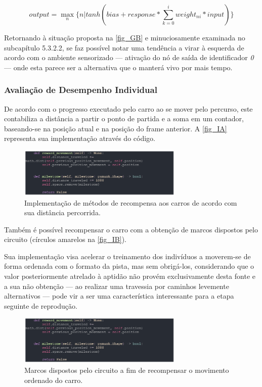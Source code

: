 \[ output = \max_{n}\{n | tanh(bias + response * \sum_{k=0}^{i} weight_{ni}*input)\} \]

Retornando à situação proposta na \autoref{fig_GB} e minuciosamente examinada no subcapítulo 5.3.2.2,
se faz possível notar uma tendência a virar à esquerda de acordo com o ambiente sensorizado —
ativação do nó de saída de identificador \textit{0} — onde esta parece ser a alternativa que o manterá vivo por mais tempo.

\subsubsection{Avaliação de Desempenho Individual}
De acordo com o progresso executado pelo carro ao se mover pelo percurso, este contabiliza a
distância a partir o ponto de partida e a soma em um contador, baseando-se na posição atual e na
posição do frame anterior. A \autoref{fig_IA} representa sua implementação através do código.

\begin{figure}[htb]
        \centering
        \caption{\label{fig_IA}Implementação de métodos de recompensa aos carros de acordo com sua distância percorrida.}
        \includegraphics[width=0.7\textwidth]{images/IA.png}
\end{figure}

Também é possível recompensar o carro com a obtenção de marcos dispostos pelo circuito (círculos amarelos na \autoref{fig_IB}). 

Sua implementação visa acelerar o treinamento dos indivíduos a moverem-se de forma ordenada com o
formato da pista, mas sem obrigá-los, considerando que o valor posteriormente atrelado à aptidão não
provém exclusivamente desta fonte e a sua não obtenção — ao realizar uma travessia por caminhos levemente
alternativos — pode vir a ser uma característica interessante para a etapa seguinte de reprodução.

\begin{figure}[htb]
        \centering
        \caption{\label{fig_IB}Marcos dispostos pelo circuito a fim de recompensar o movimento ordenado do carro.}
        \includegraphics[width=0.7\textwidth]{images/IB.png}
\end{figure}


